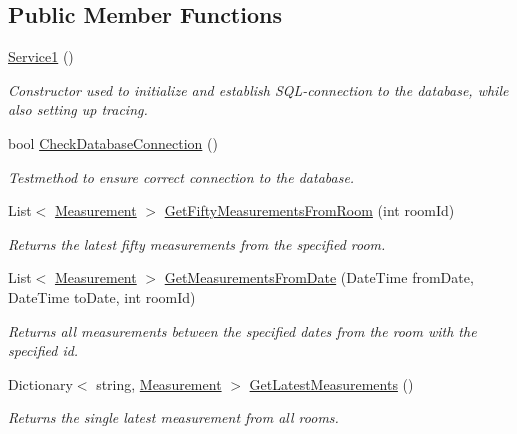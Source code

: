 \subsection*{Public Member Functions}
\begin{DoxyCompactItemize}
\item 
\hyperlink{class_w_c_f_service_web_role1_1_1_service1_a2db81b21b72abb231eebe975e129edc3}{Service1} ()
\begin{DoxyCompactList}\small\item\em Constructor used to initialize and establish S\+Q\+L-\/connection to the database, while also setting up tracing. \end{DoxyCompactList}\item 
bool \hyperlink{class_w_c_f_service_web_role1_1_1_service1_ab9f6ac135248447bd6546a3bb1cf042e}{Check\+Database\+Connection} ()
\begin{DoxyCompactList}\small\item\em Testmethod to ensure correct connection to the database. \end{DoxyCompactList}\item 
List$<$ \hyperlink{class_w_c_f_service_web_role1_1_1_measurement}{Measurement} $>$ \hyperlink{class_w_c_f_service_web_role1_1_1_service1_ab890a11f44c88ed8cabd4b441e28abb7}{Get\+Fifty\+Measurements\+From\+Room} (int room\+Id)
\begin{DoxyCompactList}\small\item\em Returns the latest fifty measurements from the specified room. \end{DoxyCompactList}\item 
List$<$ \hyperlink{class_w_c_f_service_web_role1_1_1_measurement}{Measurement} $>$ \hyperlink{class_w_c_f_service_web_role1_1_1_service1_ac5bb626b88cb7f56a06cd5e8eeeb79ab}{Get\+Measurements\+From\+Date} (Date\+Time from\+Date, Date\+Time to\+Date, int room\+Id)
\begin{DoxyCompactList}\small\item\em Returns all measurements between the specified dates from the room with the specified id. \end{DoxyCompactList}\item 
Dictionary$<$ string, \hyperlink{class_w_c_f_service_web_role1_1_1_measurement}{Measurement} $>$ \hyperlink{class_w_c_f_service_web_role1_1_1_service1_a1dadae6d813e21bf454f3ef00741b32d}{Get\+Latest\+Measurements} ()
\begin{DoxyCompactList}\small\item\em Returns the single latest measurement from all rooms. \end{DoxyCompactList}\item 

\end{DoxyCompactItemize}
